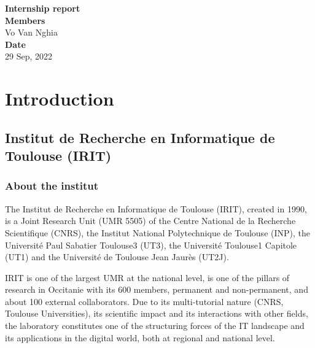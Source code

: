 \documentclass[
  a4paper, xcolor = usenames,dvipsnames]{article}
\author{}
\date{\vspace{-2.5em}}
\begin{document}
\onehalfspacing


\vspace*{\fill}
\begin{center}
  \Large{\textbf{Internship report}}\\
  \vspace*{1\baselineskip}
  \Large{\textbf{Members}}\\
  Vo Van Nghia\\
  \vfill
  \vspace*{\fill}
  \Large{\textbf{Date}}\\
  29 Sep, 2022
\end{center}

\newpage

\newpage
{}
\renewcommand{\contentsname}{Table of contents}
\tableofcontents

\newpage
{}

\hypertarget{introduction}{%
\section{Introduction}\label{introduction}}

\hypertarget{institut-de-recherche-en-informatique-de-toulouse-irit}{%
\subsection{Institut de Recherche en Informatique de Toulouse (IRIT)}\label{institut-de-recherche-en-informatique-de-toulouse-irit}}

\hypertarget{about-the-institut}{%
\subsubsection{About the institut}\label{about-the-institut}}

The Institut de Recherche en Informatique de Toulouse (IRIT), created in 1990, is a Joint Research Unit (UMR 5505) of the Centre National de la Recherche Scientifique (CNRS), the Institut National Polytechnique de Toulouse (INP), the Université Paul Sabatier Toulouse3 (UT3), the Université Toulouse1 Capitole (UT1) and the Université de Toulouse Jean Jaurès (UT2J).

IRIT is one of the largest UMR at the national level, is one of the pillars of research in Occitanie with its 600 members, permanent and non-permanent, and about 100 external collaborators. Due to its multi-tutorial nature (CNRS, Toulouse Universities), its scientific impact and its interactions with other fields, the laboratory constitutes one of the structuring forces of the IT landscape and its applications in the digital world, both at regional and national level.
\end{document}
